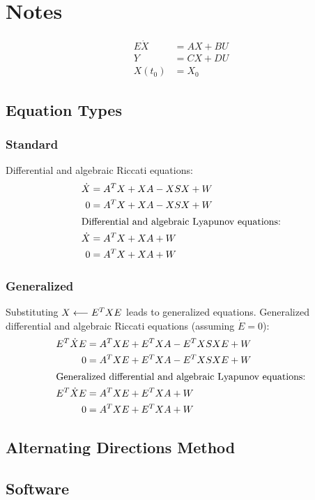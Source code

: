 \chapter{Notes}

\begin{align}
  E\dot{X} &= AX + BU \\
  Y &= CX + DU \\
  X(t_0) &= X_0
\end{align}

\section{Equation Types}
\subsection{Standard}

Differential and algebraic Riccati equations:
\begin{align}
  \dot{X} &= {A}^TX + XA - XSX + W \\
  0 &= {A}^TX + XA - XSX + W \\
\intertext{Differential and algebraic Lyapunov equations:}
  \dot{X} &= {A}^TX + XA + W \\
  0 &= {A}^TX + XA + W
\end{align}

\subsection{Generalized}

Substituting $X\longleftarrow{E}^TXE$ leads to generalized equations.
Generalized differential and algebraic Riccati equations (assuming $\dot E = 0$):
\begin{align}
  {E}^T\dot{X}E &= {A}^TXE + {E}^TXA - {E}^TXSXE + W \\
  0 &= {A}^TXE + {E}^TXA - {E}^TXSXE + W \\
\intertext{Generalized differential and algebraic Lyapunov equations:}
  {E}^T\dot{X}E &= {A}^TXE + {E}^TXA + W \\
  0 &= {A}^TXE + {E}^TXA + W \\
\end{align}

\cite{Lang2018}

\section{Alternating Directions Method}

\section{Software}

\cite{DrWatson}
